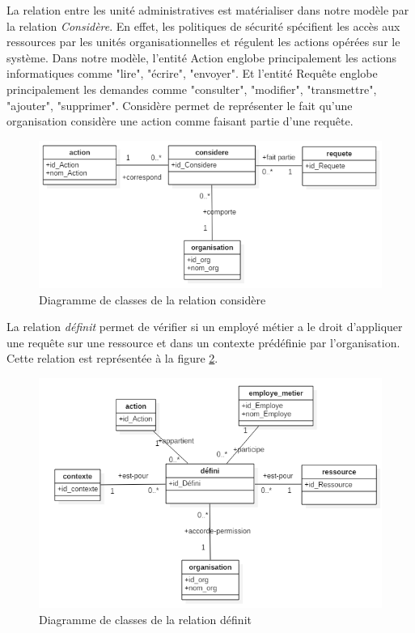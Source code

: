 \label{sectionActionRequêtes}

La relation entre les unité administratives est matérialiser dans  notre modèle par la relation \textit{Considère}. En effet, les politiques de sécurité spécifient les accès aux ressources par les unités organisationnelles et régulent les actions opérées sur le système. Dans notre modèle, l'entité Action englobe principalement les actions informatiques comme "lire", "écrire", "envoyer". Et l'entité Requête englobe principalement les demandes comme "consulter", "modifier", "transmettre", "ajouter", "supprimer". Considère permet de représenter le fait qu'une  organisation considère une action comme faisant partie d'une requête.

\begin{figure}[h!]
    \centering
		\includegraphics[scale=0.7]{chap3/images/considere.png}
    \caption{Diagramme de classes de la relation considère}
	 \label{figconsidere}
\end{figure} 

\label{sectionDéfinit}

 La relation \textit{définit} permet de vérifier si un employé métier a le droit d'appliquer une requête sur une ressource et dans un contexte prédéfinie par l'organisation. Cette relation est représentée à la figure \ref{figdefini}.

\begin{figure}[h!]
    \centering
		\includegraphics[scale=0.7]{chap3/images/defini.png}
    \caption{Diagramme de classes de la relation définit}
	 \label{figdefini}
\end{figure} 

